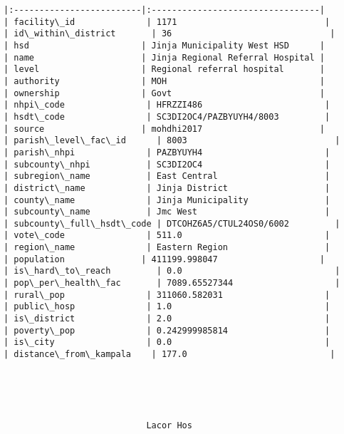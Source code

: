 \documentclass[11pt]{article}
\begin{document}
\begin{Verbatim}[commandchars=\\\{\}]
|:-------------------------|:---------------------------------|
| facility\_id              | 1171                             |
| id\_within\_district       | 36                               |
| hsd                      | Jinja Municipality West HSD      |
| name                     | Jinja Regional Referral Hospital |
| level                    | Regional referral hospital       |
| authority                | MOH                              |
| ownership                | Govt                             |
| nhpi\_code                | HFRZZI486                        |
| hsdt\_code                | SC3DI2OC4/PAZBYUYH4/8003         |
| source                   | mohdhi2017                       |
| parish\_level\_fac\_id      | 8003                             |
| parish\_nhpi              | PAZBYUYH4                        |
| subcounty\_nhpi           | SC3DI2OC4                        |
| subregion\_name           | East Central                     |
| district\_name            | Jinja District                   |
| county\_name              | Jinja Municipality               |
| subcounty\_name           | Jmc West                         |
| subcounty\_full\_hsdt\_code | DTCOHZ6A5/CTUL24OS0/6002         |
| vote\_code                | 511.0                            |
| region\_name              | Eastern Region                   |
| population               | 411199.998047                    |
| is\_hard\_to\_reach         | 0.0                              |
| pop\_per\_health\_fac       | 7089.65527344                    |
| rural\_pop                | 311060.582031                    |
| public\_hosp              | 1.0                              |
| is\_district              | 2.0                              |
| poverty\_pop              | 0.242999985814                   |
| is\_city                  | 0.0                              |
| distance\_from\_kampala    | 177.0                            |





                            Lacor Hos                             


\end{Verbatim}
\end{document}
